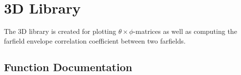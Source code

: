\section{3D Library}

The 3D library is created for plotting $\theta \times \phi$-matrices as well as computing the farfield envelope correlation coefficient between two farfields.

\subsection{Function Documentation}

